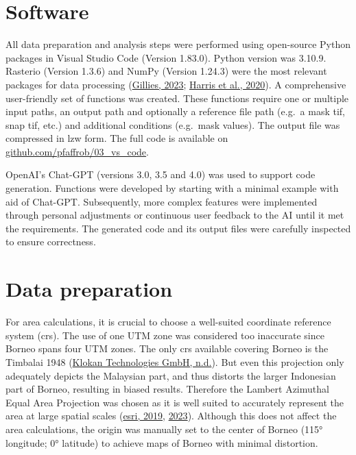 \documentclass[
  letterpaper,
  DIV=11,
  numbers=noendperiod]{scrreprt}
\begin{document}
\hypertarget{software}{%
\section{Software}\label{software}}

All data preparation and analysis steps were performed using open-source
Python packages in Visual Studio Code (Version 1.83.0). Python version
was 3.10.9. Rasterio (Version 1.3.6) and NumPy (Version 1.24.3) were the
most relevant packages for data processing
(\protect\hyperlink{ref-gilliesRasterioDocumentation2023}{Gillies,
2023}; \protect\hyperlink{ref-harrisArrayProgrammingNumPy2020}{Harris et
al., 2020}). A comprehensive user-friendly set of functions was created.
These functions require one or multiple input paths, an output path and
optionally a reference file path (e.g.~a mask tif, snap tif, etc.) and
additional conditions (e.g.~mask values). The output file was compressed
in lzw form. The full code is available on
\href{https://github.com/pfaffrob/03_vs_code}{github.com/pfaffrob/03\_vs\_code}.

OpenAI's Chat-GPT (versions 3.0, 3.5 and 4.0) was used to support code
generation. Functions were developed by starting with a minimal example
with aid of Chat-GPT. Subsequently, more complex features were
implemented through personal adjustments or continuous user feedback to
the AI until it met the requirements. The generated code and its output
files were carefully inspected to ensure correctness.

\hypertarget{data-preparation}{%
\section{Data preparation}\label{data-preparation}}

For area calculations, it is crucial to choose a well-suited coordinate
reference system (crs). The use of one UTM zone was considered too
inaccurate since Borneo spans four UTM zones. The only crs available
covering Borneo is the Timbalai 1948
(\protect\hyperlink{ref-klokantechnologiesgmbhTimbalai1948RSO}{Klokan
Technologies GmbH, n.d.}). But even this projection only adequately
depicts the Malaysian part, and thus distorts the larger Indonesian part
of Borneo, resulting in biased results. Therefore the Lambert Azimuthal
Equal Area Projection was chosen as it is well suited to accurately
represent the area at large spatial scales
(\protect\hyperlink{ref-esriQuick_Notes_on_Map_Projections_in_ArcGIS_nov2019Pdf2019}{esri,
2019}, \protect\hyperlink{ref-esriLambertAzimuthalEqualarea2023}{2023}).
Although this does not affect the area calculations, the origin was
manually set to the center of Borneo (115° longitude; 0° latitude) to
achieve maps of Borneo with minimal distortion.
\end{document}
